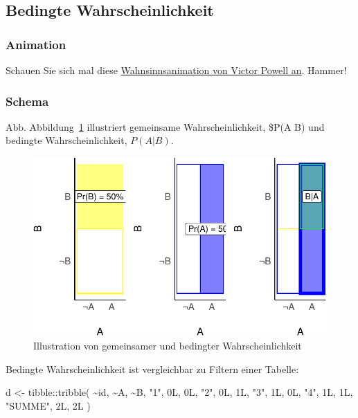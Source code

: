 \documentclass[
  a4paper,
  DIV=11]{scrreprt}
\newenvironment{Shaded}{\begin{snugshade}}{\end{snugshade}}
\newcommand{\FunctionTok}[1]{\textcolor[rgb]{0.28,0.35,0.67}{#1}}
\newcommand{\NormalTok}[1]{\textcolor[rgb]{0.00,0.23,0.31}{#1}}
\newcommand{\OtherTok}[1]{\textcolor[rgb]{0.00,0.23,0.31}{#1}}
\newcommand{\SpecialCharTok}[1]{\textcolor[rgb]{0.37,0.37,0.37}{#1}}
\newcommand{\StringTok}[1]{\textcolor[rgb]{0.13,0.47,0.30}{#1}}
\theoremstyle{definition}
\theoremstyle{remark}
\begin{document}
\hypertarget{bedingte-wahrscheinlichkeit}{%
\subsection{Bedingte
Wahrscheinlichkeit}\label{bedingte-wahrscheinlichkeit}}

\hypertarget{animation}{%
\subsubsection{Animation}\label{animation}}

Schauen Sie sich mal diese
\href{https://setosa.io/conditional/}{Wahnsinnsanimation von Victor
Powell an}. Hammer!

\hypertarget{schema}{%
\subsubsection{Schema}\label{schema}}

Abb. Abbildung~\ref{fig-schema-p} illustriert gemeinsame
Wahrscheinlichkeit, \$P(A \cap B) und bedingte Wahrscheinlichkeit,
\(P(A|B)\).

\begin{figure}

{\centering \includegraphics{./Wskt_files/figure-pdf/fig-schema-p-1.pdf}

}

\caption{\label{fig-schema-p}Illustration von gemeinsamer und bedingter
Wahrscheinlichkeit}

\end{figure}

Bedingte Wahrscheinlichkeit ist vergleichbar zu Filtern einer Tabelle:

\begin{Shaded}
\begin{Highlighting}[]
\NormalTok{d }\OtherTok{\textless{}{-}} 
\NormalTok{  tibble}\SpecialCharTok{::}\FunctionTok{tribble}\NormalTok{(}
      \SpecialCharTok{\textasciitilde{}}\NormalTok{id, }\SpecialCharTok{\textasciitilde{}}\NormalTok{A, }\SpecialCharTok{\textasciitilde{}}\NormalTok{B,}
      \StringTok{"1"}\NormalTok{, 0L, 0L,}
      \StringTok{"2"}\NormalTok{, 0L, 1L,}
      \StringTok{"3"}\NormalTok{, 1L, 0L,}
      \StringTok{"4"}\NormalTok{, 1L, 1L,}
  \StringTok{"SUMME"}\NormalTok{, 2L, 2L}
\NormalTok{  )}
\end{Highlighting}
\end{Shaded}
\end{document}
